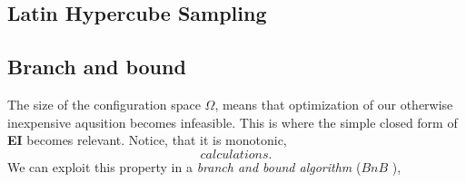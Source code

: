 \documentclass[working, oneside]{../../Preambles/tuftebook}
\begin{document}
\subsection{Latin Hypercube Sampling}
\subsection{Branch and bound}
The size of the configuration space $\Omega$, means that optimization of our otherwise inexpensive aqusition becomes infeasible. This is where the simple closed form of \textbf{EI} becomes relevant. Notice, that it is monotonic,
\[
calculations
.\] 
We can exploit this property in a \textit{branch and bound algorithm} ($BnB$ ),
\end{document}
